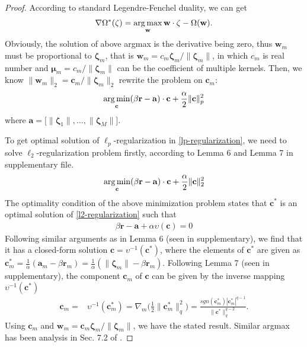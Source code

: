 \documentclass{article}
\newcommand{\argmax}{\operatornamewithlimits{arg\,max}}
\newcommand{\argmin}{\operatornamewithlimits{arg\,min}}
\begin{document}
\begin{proof}
According to standard Legendre-Fenchel duality, we can get
\begin{align}
\nabla\Omega^*(\mathbf{\zeta})=\argmax\limits_{\mathbf{w}} \mathbf{w} \cdot \mathbf{\zeta} - \Omega(\mathbf{w}).
\end{align}
Obviously, the solution of above argmax is the derivative being zero, thus $\mathbf{w}_m$ must be proportional to $\mathbf{\zeta}_m$, that is $\mathbf{w}_m=c_m\mathbf{\zeta}_m/\|\mathbf{\zeta}_m\|$, in which $c_m$ is real number and $\mathbf{\mu}_m=c_m/\|\mathbf{\zeta}_m\|$ can be the coefficient of multiple kernels. Then, we know $\|\mathbf{w}_m\|_2=\mathbf{c}_m/\|\mathbf{\zeta}_m\|_2$ rewrite the problem on $\mathbf{c}_m$:
\begin{align}
    \label{lp-regularization}
    \argmin \limits_{\mathbf{c}} (\beta\mathbf{r} - \mathbf{a})\cdot\mathbf{c}+\frac{\alpha}{2}\|\mathbf{c}\|_p^2
\end{align}
where $\mathbf{a}=\Big[\|\mathbf{\zeta}_1\|,\ldots, \|\mathbf{\zeta}_M\|\Big]$.

To get optimal solution of $\ell_p$-regularization in \eqref{lp-regularization}, we need to solve $\ell_2$-regularization problem firstly, according to Lemma 6 and Lemma 7 in supplementary file.
\begin{align}
 \label{l2-regularization}
    \argmin \limits_{\mathbf{c}} (\beta\mathbf{r} - \mathbf{a})\cdot\mathbf{c}+\frac{\alpha}{2}\|\mathbf{c}\|_2^2
\end{align}
The optimality condition of the above minimization problem\cite{rockafellar2015convex} states that $\mathbf{c}^\ast$ is an optimal solution of \eqref{l2-regularization} such that
\begin{align}
    \label{l2-regularization-subgradient}
        \beta\mathbf{r}-\mathbf{a}+\alpha\upsilon(\mathbf{c})=0
\end{align}
Following similar arguments as in Lemma 6 (seen in supplementary), we find that it has a closed-form solution
$\mathbf{c}=\upsilon ^{-1}(\mathbf{c}^\ast)$,
where the elements of $\mathbf{c}^\ast$ are given as
$
    \mathbf{c}_m^\ast=\frac{1}{\alpha}(\mathbf{a}_m-\beta\mathbf{r}_m)=\frac{1}{\alpha}(\|\mathbf{\zeta}_m\|-\beta\mathbf{r}_m).
$
Following Lemma 7 (seen in supplementary), the component $\mathbf{c}_m$ of $\mathbf{c}$ can be given by the inverse mapping $\upsilon ^{-1}(\mathbf{c}^\ast)$
\begin{align*}
    \mathbf{c}_m=&\upsilon ^{-1}(\mathbf{c}_m^\ast)=\nabla_m\Big(\frac{1}{2}\|\mathbf{c}_m^\ast\|_q^2\Big)
    =\frac{sgn(\mathbf{c}_m^\ast)|\mathbf{c}_m^\ast|^{q-1}}{\|\mathbf{c}^\ast\|_q^{q-2}}.
\end{align*}
Using $\mathbf{c}_m$ and $\mathbf{w}_m=\mathbf{c}_m\mathbf{\zeta}_m/\|\mathbf{\zeta}_m\|$, we have the stated result.
Similar argmax has been analysis in Sec. 7.2 of \cite{Xiao10}.
\end{proof}
\end{document}
